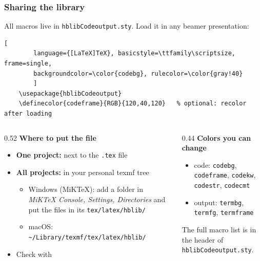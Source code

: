 \documentclass[aspectratio=169,10pt,compress]{beamer}
\begin{document}
\begin{frame}[t,fragile] \frametitle{Sharing the library}
  All macros live in \texttt{hblibCodeoutput.sty}. Load it in any beamer presentation:


\begin{lstlisting}[
		language={[LaTeX]TeX}, basicstyle=\ttfamily\scriptsize, frame=single,
		backgroundcolor=\color{codebg}, rulecolor=\color{gray!40}
		]
	\usepackage{hblibCodeoutput}
	\definecolor{codeframe}{RGB}{120,40,120}   % optional: recolor after loading
\end{lstlisting}


  \begin{columns}[T]
    \begin{column}{0.52\textwidth}
      \textbf{Where to put the file}
      \begin{itemize}\small
        \item \textbf{One project:} next to the \texttt{.tex} file
        \item \textbf{All projects:} in your personal texmf tree
              \begin{itemize}\footnotesize
                \item Windows (MiKTeX): add a folder in \emph{MiKTeX Console, Settings, Directories}
                      and put the files in its \texttt{tex/latex/hblib/}
                \item macOS: \texttt{\textasciitilde/Library/texmf/tex/latex/hblib/}
              \end{itemize}
        \item Check with 
      \end{itemize}
    \end{column}
    \begin{column}{0.44\textwidth}
      \textbf{Colors you can change}
      \begin{itemize}\small
        \item code: \texttt{codebg}, \texttt{codeframe}, \texttt{codekw}, \texttt{codestr}, \texttt{codecmt}
        \item output: \texttt{termbg}, \texttt{termfg}, \texttt{termframe}
      \end{itemize}
      \small The full macro list is in the header of \texttt{hblibCodeoutput.sty}.
    \end{column}
  \end{columns}
\end{frame}
\end{document}
